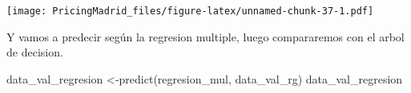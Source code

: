\documentclass[
]{article}
\newenvironment{Shaded}{\begin{snugshade}}{\end{snugshade}}
\newcommand{\AttributeTok}[1]{\textcolor[rgb]{0.77,0.63,0.00}{#1}}
\newcommand{\DecValTok}[1]{\textcolor[rgb]{0.00,0.00,0.81}{#1}}
\newcommand{\FunctionTok}[1]{\textcolor[rgb]{0.00,0.00,0.00}{#1}}
\newcommand{\NormalTok}[1]{#1}
\newcommand{\OtherTok}[1]{\textcolor[rgb]{0.56,0.35,0.01}{#1}}
\newcommand{\SpecialCharTok}[1]{\textcolor[rgb]{0.00,0.00,0.00}{#1}}
\newcommand{\StringTok}[1]{\textcolor[rgb]{0.31,0.60,0.02}{#1}}
\begin{document}
\begin{Shaded}
\end{Shaded}

\texttt{[image: PricingMadrid\_files/figure-latex/unnamed-chunk-37-1.pdf]}

Y vamos a predecir según la regresion multiple, luego compararemos con
el arbol de decision.

\begin{Shaded}
\begin{Highlighting}[]
\NormalTok{data\_val\_regresion }\OtherTok{\textless{}{-}}\FunctionTok{predict}\NormalTok{(regresion\_mul, data\_val\_rg)}
\NormalTok{data\_val\_regresion}
\end{Highlighting}
\end{Shaded}
\end{document}
